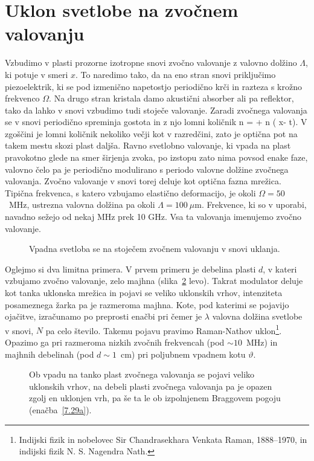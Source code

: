 \section{Uklon svetlobe na zvočnem valovanju}
Vzbudimo v plasti prozorne izotropne snovi zvočno valovanje z valovno dolžino $\Lambda$, 
ki potuje v smeri $x$. To naredimo tako, da na eno stran snovi priključimo piezoelektrik, 
ki se pod izmenično napetostjo periodično krči in razteza s krožno frekvenco $\Omega$.
Na drugo stran kristala damo akustični absorber ali pa reflektor, tako da lahko 
v snovi vzbudimo tudi stoječe valovanje. 
Zaradi zvočnega valovanja se v snovi periodično spreminja gostota in 
z njo lomni količnik
\beq
n =  + \Delta n \sin \left(\frac{2\pi}{\Lambda} x- \Omega t\right).
\eeq
V zgoščini je lomni količnik nekoliko večji kot v razredčini, zato je optična pot na takem mestu
skozi plast daljša. Ravno svetlobno valovanje, ki vpada na plast pravokotno glede
na smer širjenja zvoka, po izstopu zato nima povsod enake faze, 
valovno čelo pa je periodično modulirano s periodo 
valovne dolžine zvočnega valovanja. Zvočno valovanje v snovi torej deluje kot 
optična fazna mrežica. Tipična frekvenca, s katero vzbujamo elastično
deformacijo, je okoli $\Omega=50$~MHz, ustrezna valovna dolžina pa okoli $\Lambda = 100~\mu$m. 
Frekvence, ki so v uporabi, navadno sežejo od nekaj MHz prek 10 GHz. Vsa ta valovanja imenujemo
zvočno valovanje. 

\begin{figure}[h]
\centering
\def\svgwidth{60truemm} 

\caption{Vpadna svetloba se na stoječem zvočnem valovanju v snovi uklanja.}
\label{fig:ao}
\end{figure}

Oglejmo si dva limitna primera. V prvem primeru je debelina plasti $d$, 
v kateri vzbujamo zvočno valovanje, zelo majhna (slika~\ref{fig:ao_bragg} levo). 
Takrat modulator deluje kot tanka uklonska mrežica in pojavi se veliko 
uklonskih vrhov, intenziteta posameznega žarka pa je razmeroma majhna. 
Kote, pod katerimi se pojavijo ojačitve, izračunamo po preprosti enačbi
pri čemer je $\lambda$ valovna dolžina svetlobe v snovi, $N$ pa celo število. Takemu pojavu 
pravimo Raman-Nathov uklon\footnote{Indijski fizik in nobelovec Sir Chandrasekhara 
Venkata Raman, 1888--1970, 
in indijski fizik N. S. Nagendra Nath.}. Opazimo ga pri razmeroma nizkih zvočnih frekvencah 
(pod $\sim10$~MHz) in majhnih debelinah (pod $d\sim 1$~cm) pri poljubnem vpadnem 
kotu $\vartheta$.
\begin{figure}[h]
\centering
\def\svgwidth{50truemm} 
\qquad
\def\svgwidth{65truemm} 

\caption{Ob vpadu na tanko plast zvočnega valovanja se pojavi veliko uklonskih vrhov, 
na debeli plasti zvočnega valovanja pa je opazen zgolj en uklonjen vrh, 
pa še ta le ob izpolnjenem Braggovem pogoju (enačba~\ref{7.29a}).}
\label{fig:ao_bragg}
\end{figure}

